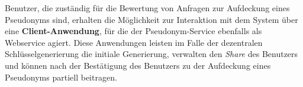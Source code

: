 Benutzer, die zuständig für die Bewertung von Anfragen zur Aufdeckung eines Pseudonyms sind, erhalten die Möglichkeit zur Interaktion mit dem System über eine \textbf{Client-Anwendung}, für die der Pseudonym-Service ebenfalls als Webservice agiert. Diese Anwendungen leisten im Falle der dezentralen Schlüsselgenerierung die initiale Generierung, verwalten den \textit{Share} des Benutzers und können nach der Bestätigung des Benutzers zu der Aufdeckung eines Pseudonyms partiell beitragen. 
